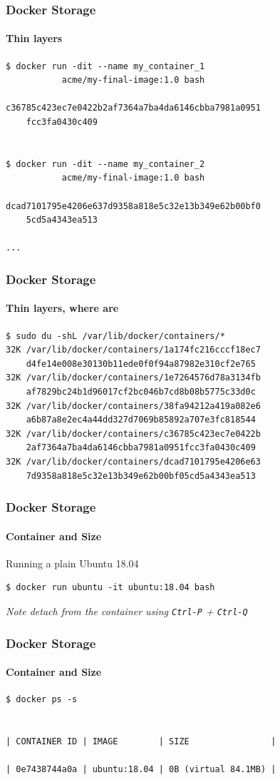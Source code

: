 \begin{frame}[fragile]
\frametitle{Docker Storage}
\framesubtitle{Thin layers}
\begin{lstlisting}
$ docker run -dit --name my_container_1
           acme/my-final-image:1.0 bash

c36785c423ec7e0422b2af7364a7ba4da6146cbba7981a0951
	fcc3fa0430c409


$ docker run -dit --name my_container_2 
           acme/my-final-image:1.0 bash
		   
dcad7101795e4206e637d9358a818e5c32e13b349e62b00bf0
	5cd5a4343ea513

...
\end{lstlisting}
\end{frame}

\begin{frame}[fragile]
\frametitle{Docker Storage}
\framesubtitle{Thin layers, where are }
\begin{lstlisting}
$ sudo du -shL /var/lib/docker/containers/*
32K /var/lib/docker/containers/1a174fc216cccf18ec7
	d4fe14e008e30130b11ede0f0f94a87982e310cf2e765
32K /var/lib/docker/containers/1e7264576d78a3134fb
	af7829bc24b1d96017cf2bc046b7cd8b08b5775c33d0c
32K /var/lib/docker/containers/38fa94212a419a082e6
	a6b87a8e2ec4a44dd327d7069b85892a707e3fc818544
32K /var/lib/docker/containers/c36785c423ec7e0422b
	2af7364a7ba4da6146cbba7981a0951fcc3fa0430c409
32K /var/lib/docker/containers/dcad7101795e4206e63
	7d9358a818e5c32e13b349e62b00bf05cd5a4343ea513 
\end{lstlisting}
\end{frame}

\begin{frame}[fragile]
\frametitle{Docker Storage}
\framesubtitle{Container and Size}
Running a plain Ubuntu 18.04
\vspace{0.4cm}
\begin{lstlisting}
$ docker run ubuntu -it ubuntu:18.04 bash
\end{lstlisting}
\vspace{0.4cm}
\it{Note} detach from the container using \lstinline!Ctrl-P! + \lstinline!Ctrl-Q!
\end{frame}

\begin{frame}[fragile]
\frametitle{Docker Storage}
\framesubtitle{Container and Size}
\begin{lstlisting}
$ docker ps -s


| CONTAINER ID | IMAGE        | SIZE                |

| 0e7438744a0a | ubuntu:18.04 | 0B (virtual 84.1MB) |
\end{lstlisting}
\end{frame}

